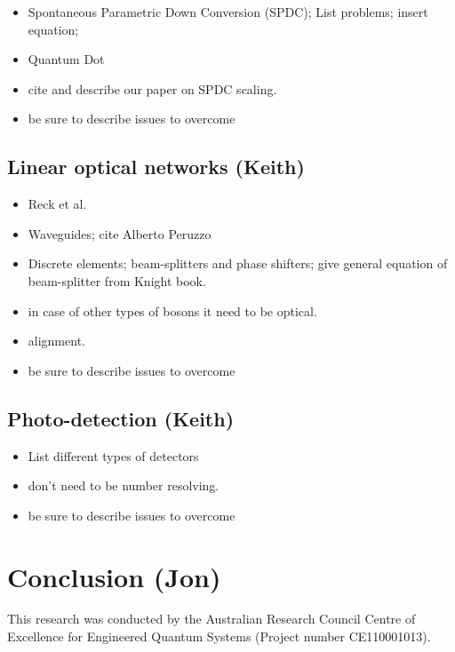 \documentclass[aps,pra,twocolumn,amsmath,amssymb,nofootinbib,superscriptaddress]{revtex4}
\begin{document}
\begin{itemize}
\item Spontaneous Parametric Down Conversion (SPDC); List problems; insert equation; 
\item Quantum Dot
\item cite and describe our paper on SPDC scaling.
\item be sure to describe issues to overcome
\end{itemize}

\subsection{Linear optical networks (Keith)}

\begin{itemize}
\item Reck et al.
\item Waveguides; cite Alberto Peruzzo
\item Discrete elements; beam-splitters and phase shifters; give general equation of beam-splitter from Knight book.
\item in case of other types of bosons it need to be optical.
\item alignment.
\item be sure to describe issues to overcome
\end{itemize}

\subsection{Photo-detection (Keith)}

\begin{itemize}
\item List different types of detectors
\item don't need to be number resolving.
\item be sure to describe issues to overcome
\end{itemize}

\section{Conclusion (Jon)}

%
%

\begin{acknowledgments}
This research was conducted by the Australian Research Council Centre of Excellence for Engineered Quantum Systems (Project number CE110001013).
\end{acknowledgments}

%
%


\end{document}
